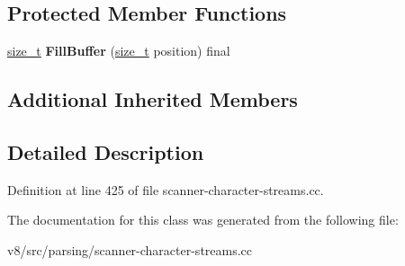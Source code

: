 \subsection*{Protected Member Functions}
\begin{DoxyCompactItemize}
\item 
\mbox{\label{classv8_1_1internal_1_1Utf8ExternalStreamingStream_a560ee78197e188a6e0ffe1501b5bc575}} 
\mbox{\hyperlink{classsize__t}{size\+\_\+t}} {\bfseries Fill\+Buffer} (\mbox{\hyperlink{classsize__t}{size\+\_\+t}} position) final
\end{DoxyCompactItemize}
\subsection*{Additional Inherited Members}


\subsection{Detailed Description}


Definition at line 425 of file scanner-\/character-\/streams.\+cc.



The documentation for this class was generated from the following file\+:\begin{DoxyCompactItemize}
\item 
v8/src/parsing/scanner-\/character-\/streams.\+cc\end{DoxyCompactItemize}
